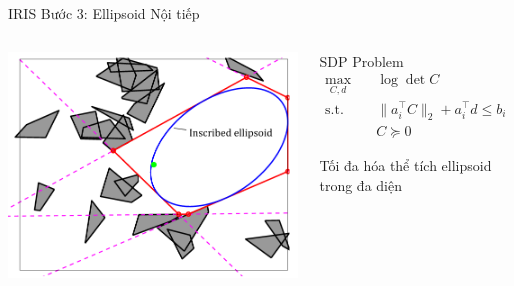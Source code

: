 \documentclass[aspectratio=169]{beamer}
\begin{document}
\begin{frame}{IRIS Bước 3: Ellipsoid Nội tiếp}
    \begin{columns}[c]
        \includegraphics[width=\textwidth]{../imgs/iris_2.png}

        

        \begin{block}{SDP Problem}
            \small
            \[
                \begin{aligned}
                    \max_{C,d} \quad  & \log \det C                            \\
                    \text{s.t.} \quad & \|a_i^\top C\|_2 + a_i^\top d \leq b_i \\
                                      & C \succeq 0
                \end{aligned}
            \]

            Tối đa hóa thể tích ellipsoid trong đa diện
        \end{block}
    \end{columns}
\end{frame}
\end{document}
